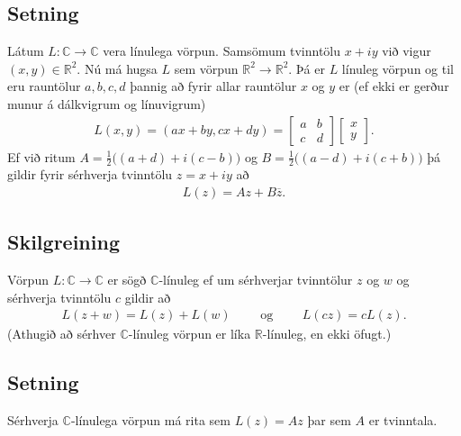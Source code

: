 \documentclass[a4paper,10pt,icelandic]{sphinxmanual}
\begin{document}
\subsection{Setning}
\label{\detokenize{Kafli01:id12}}
Látum \(L:{\mathbb{C}}\rightarrow {\mathbb{C}}\) vera
línulega vörpun. Samsömum tvinntölu \(x+iy\) við vigur
\((x,y)\in \mathbb{R}^2\). Nú má hugsa \(L\) sem vörpun
\(\mathbb{R}^2\rightarrow \mathbb{R}^2\). Þá er \(L\) línuleg vörpun og til eru
rauntölur \(a, b, c, d\) þannig að fyrir allar rauntölur \(x\)
og \(y\) er (ef ekki er gerður munur á dálkvigrum og línuvigrum)
\begin{equation*}
\begin{split}L(x,y)=(ax+by, cx+dy)=\begin{bmatrix}a&b\\c&d\end{bmatrix}
\begin{bmatrix}x\\y\end{bmatrix}.\end{split}
\end{equation*}
Ef við ritum \(A=\frac{1}{2}\big((a+d)+i(c-b)\big)\) og
\(B=\frac{1}{2}\big((a-d)+i(c+b)\big)\) þá gildir fyrir sérhverja
tvinntölu \(z=x+iy\) að
\begin{equation*}
\begin{split}L(z)=Az+B\overline{z}.\end{split}
\end{equation*}

\subsection{Skilgreining}
\label{\detokenize{Kafli01:id13}}
Vörpun \(L:{\mathbb{C}}\rightarrow {\mathbb{C}}\) er sögð
\({\mathbb{C}}\)-línuleg ef um sérhverjar tvinntölur \(z\) og \(w\) og
sérhverja tvinntölu \(c\) gildir að
\begin{equation*}
\begin{split}L(z+w)=L(z)+L(w)\qquad \mbox{ og }\qquad L(cz)=cL(z).\end{split}
\end{equation*}
(Athugið að sérhver \({\mathbb{C}}\)-línuleg vörpun er líka
\(\mathbb{R}\)-línuleg, en ekki öfugt.)


\subsection{Setning}
\label{\detokenize{Kafli01:id14}}
Sérhverja \({\mathbb{C}}\)-línulega vörpun má
rita sem \(L(z)=Az\) þar sem \(A\) er tvinntala.
\end{document}
